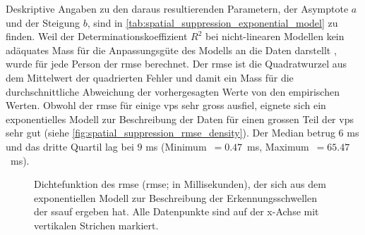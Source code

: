\documentclass[11pt, twoside, a4paper]{book}		%
\begin{document}
Deskriptive Angaben zu den daraus resultierenden Parametern, der Asymptote $a$ und der Steigung $b$, sind in \autoref{tab:spatial_suppression_exponential_model} zu finden.
Weil der Determinationskoeffizient $R^2$ bei nicht-linearen Modellen kein adäquates Mass für die Anpassungsgüte des Modells an die Daten darstellt \citep{Spiess2010}, wurde für jede Person der \gls{rmse} berechnet. Der \gls{rmse} ist die Quadratwurzel aus dem Mittelwert der quadrierten Fehler und damit ein Mass für die durchschnittliche Abweichung der vorhergesagten Werte von den empirischen Werten. 
Obwohl der \gls{rmse} für einige \glspl{vp} sehr gross ausfiel, eignete sich ein exponentielles Modell zur Beschreibung der Daten für einen grossen Teil der \glspl{vp} sehr gut (siehe \autoref{fig:spatial_suppression_rmse_density}). Der Median betrug $6$ ms und das dritte Quartil lag bei $9$ ms (Minimum~$=0.47$~ms, Maximum~$=65.47$~ms).

\begin{figure}[t]
	\centering
	\begin{adjustbox}{width=1\textwidth}
		
	\end{adjustbox}
	\caption[Dichtefunktion des aus der \gls{ssauf} mit einer exponentiellen Regression abgeleiteten \gls{rmse}]{Dichtefunktion des \acrlong{rmse} (\gls{rmse}; in Millisekunden), der sich aus dem exponentiellen Modell zur Beschreibung der Erkennungsschwellen der \gls{ssauf} ergeben hat. Alle Datenpunkte sind auf der x-Achse mit vertikalen Strichen markiert.}
	\label{fig:spatial_suppression_rmse_density}
\end{figure}
\end{document}
